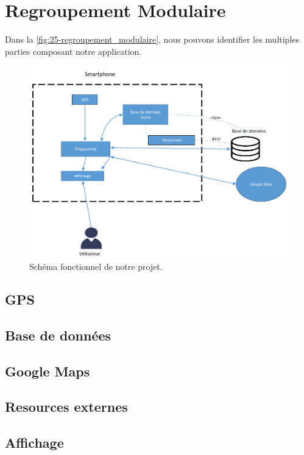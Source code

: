 \chapter{Regroupement Modulaire}

Dans la \autoref{fig:25-regroupement_modulaire}, nous pouvons identifier les multiples parties composant notre application.

\begin{figure}[h]
    \centering
    \includegraphics[keepaspectratio, width=2\textwidth/2, height=2\textheight/5]{ima/regroupement_modulaire}
    \caption{Schéma fonctionnel de notre projet.}
    \label{fig:25-regroupement_modulaire}
\end{figure}

\section{GPS}


\section{Base de données}

\section{Google Maps}

\section{Resources externes}

\section{Affichage}

